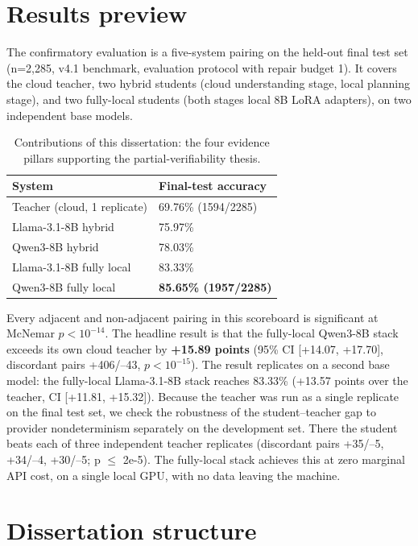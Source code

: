 \documentclass[10pt]{article} %
\begin{document}
\section{Results preview}\label{sec:results-preview}

The confirmatory evaluation is a five-system pairing on the held-out final test set (n=2,285, v4.1 benchmark, evaluation protocol with repair budget 1). It covers the cloud teacher, two hybrid students (cloud understanding stage, local planning stage), and two fully-local students (both stages local 8B LoRA adapters), on two independent base models.

\begin{table}[t]
\centering
\small
\caption{Contributions of this dissertation: the four evidence pillars supporting the partial-verifiability thesis.}
\label{tab:01_introduction_1}
\begin{tabular}{ll}
\toprule
System & Final-test accuracy \\
\midrule
Teacher (cloud, 1 replicate) & 69.76\% (1594/2285) \\
Llama-3.1-8B hybrid & 75.97\% \\
Qwen3-8B hybrid & 78.03\% \\
Llama-3.1-8B fully local & 83.33\% \\
Qwen3-8B fully local & \textbf{85.65\% (1957/2285)} \\
\bottomrule
\end{tabular}
\end{table}


Every adjacent and non-adjacent pairing in this scoreboard is significant at McNemar $p<10^{-14}$. The headline result is that the fully-local Qwen3-8B stack exceeds its own cloud teacher by \textbf{+15.89 points} (95\% CI [+14.07, +17.70], discordant pairs +406/--43, $p<10^{-15}$). The result replicates on a second base model: the fully-local Llama-3.1-8B stack reaches 83.33\% (+13.57 points over the teacher, CI [+11.81, +15.32]). Because the teacher was run as a single replicate on the final test set, we check the robustness of the student--teacher gap to provider nondeterminism separately on the development set. There the student beats each of three independent teacher replicates (discordant pairs +35/--5, +34/--4, +30/--5; p $\leq$ 2e-5). The fully-local stack achieves this at zero marginal API cost, on a single local GPU, with no data leaving the machine.

\section{Dissertation structure}\label{sec:dissertation-structure}
\end{document}
